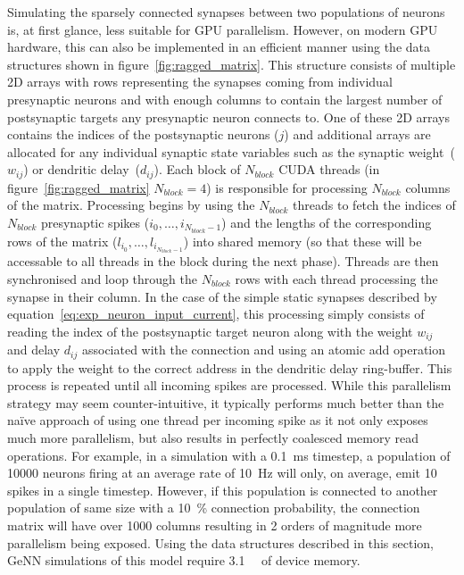 \documentclass[utf8]{frontiersSCNS} %
\begin{document}
Simulating the sparsely connected synapses between two populations of neurons is, at first glance, less suitable for GPU parallelism.
However, on modern GPU hardware, this can also be implemented in an efficient manner using the data structures shown in figure~\ref{fig:ragged_matrix}.
This structure consists of multiple 2D arrays with rows representing the synapses coming from individual presynaptic neurons and with enough columns to contain the largest number of postsynaptic targets any presynaptic neuron connects to.
One of these 2D arrays contains the indices of the postsynaptic neurons ($j$) and additional arrays are allocated for any individual synaptic state variables such as the synaptic weight~($w_{ij}$) or dendritic delay~($d_{ij}$).
Each block of $N_{block}$ CUDA threads (in figure~\ref{fig:ragged_matrix} $N_{block}=4$) is responsible for processing $N_{block}$ columns of the matrix.
Processing begins by using the $N_{block}$ threads to fetch the indices of $N_{block}$ presynaptic spikes ($i_{0},\ldots,i_{N_{block} - 1}$) and the lengths of the corresponding rows of the matrix ($l_{i_{0}},\ldots,l_{i_{N_{block} - 1}}$) into shared memory (so that these will be accessable to all threads in the block during the next phase).
Threads are then synchronised and loop through the $N_{block}$ rows with each thread processing the synapse in their column.
In the case of the simple static synapses described by equation~\ref{eq:exp_neuron_input_current}, this processing simply consists of reading the index of the postsynaptic target neuron along with the weight $w_{ij}$ and delay $d_{ij}$ associated with the connection and using an atomic add operation to apply the weight to the correct address in the dendritic delay ring-buffer.
This process is repeated until all incoming spikes are processed.
While this parallelism strategy may seem counter-intuitive, it typically performs much better than the naïve approach of using one thread per incoming spike as it not only exposes much more parallelism, but also results in perfectly coalesced memory read operations.
For example, in a simulation with a \SI{0.1}{\milli\second} timestep, a population of \num{10000} neurons firing at an average rate of \SI{10}{\hertz} will only, on average, emit \num{10} spikes in a single timestep.
However, if this population is connected to another population of same size with a \SI{10}{\percent} connection probability, the connection matrix will have over \num{1000} columns resulting in 2 orders of magnitude more parallelism being exposed.
Using the data structures described in this section, GeNN simulations of this model require \SI{3.1}{\giga\byte} of device memory.
\end{document}
